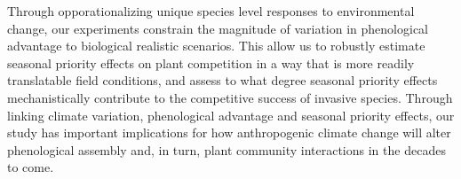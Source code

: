 \documentclass{article}\usepackage[]{graphicx}\usepackage[]{color}
\begin{document}
Through opporationalizing unique species level responses to environmental change, our experiments constrain the magnitude of variation in phenological advantage to biological realistic scenarios. This allow us to robustly estimate seasonal priority effects on plant competition in a way that is more readily translatable field conditions, and assess to what degree seasonal priority effects mechanistically contribute to the competitive success of invasive species. Through linking climate variation, phenological advantage and seasonal priority effects, our study has important implications for how anthropogenic climate change will alter phenological assembly and, in turn, plant community interactions in the decades to come.
\end{document}
